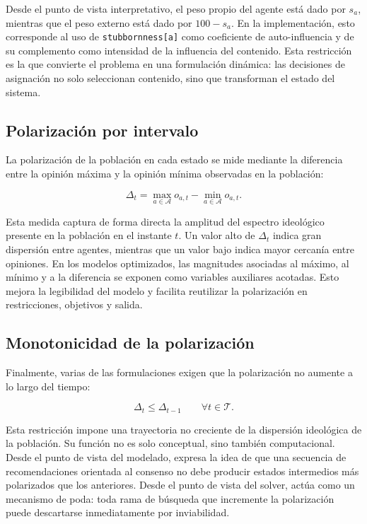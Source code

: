 \documentclass[10pt,letterpaper]{article}
\begin{document}
Desde el punto de vista interpretativo, el peso propio del agente est\'a dado por \(s_a\), mientras que el peso externo est\'a dado por \(100-s_a\). En la implementaci\'on, esto corresponde al uso de \texttt{stubbornness[a]} como coeficiente de auto-influencia y de su complemento como intensidad de la influencia del contenido. Esta restricci\'on es la que convierte el problema en una formulaci\'on din\'amica: las decisiones de asignaci\'on no solo seleccionan contenido, sino que transforman el estado del sistema.

\subsection{Polarizaci\'on por intervalo}

La polarizaci\'on de la poblaci\'on en cada estado se mide mediante la diferencia entre la opini\'on m\'axima y la opini\'on m\'inima observadas en la poblaci\'on:

\[
\Delta_t = \max_{a \in \mathcal{A}} o_{a,t} - \min_{a \in \mathcal{A}} o_{a,t}.
\]

Esta medida captura de forma directa la amplitud del espectro ideol\'ogico presente en la poblaci\'on en el instante \(t\). Un valor alto de \(\Delta_t\) indica gran dispersi\'on entre agentes, mientras que un valor bajo indica mayor cercan\'ia entre opiniones. En los modelos optimizados, las magnitudes asociadas al m\'aximo, al m\'inimo y a la diferencia se exponen como variables auxiliares acotadas. Esto mejora la legibilidad del modelo y facilita reutilizar la polarizaci\'on en restricciones, objetivos y salida.

\subsection{Monotonicidad de la polarizaci\'on}

Finalmente, varias de las formulaciones exigen que la polarizaci\'on no aumente a lo largo del tiempo:

\[
\Delta_t \leq \Delta_{t-1} \qquad \forall t\in\mathcal{T}.
\]

Esta restricci\'on impone una trayectoria no creciente de la dispersi\'on ideol\'ogica de la poblaci\'on. Su funci\'on no es solo conceptual, sino tambi\'en computacional. Desde el punto de vista del modelado, expresa la idea de que una secuencia de recomendaciones orientada al consenso no debe producir estados intermedios m\'as polarizados que los anteriores. Desde el punto de vista del solver, act\'ua como un mecanismo de poda: toda rama de b\'usqueda que incremente la polarizaci\'on puede descartarse inmediatamente por inviabilidad.
\end{document}
